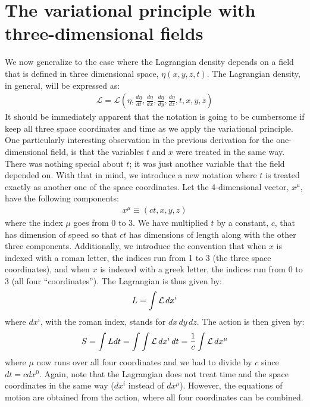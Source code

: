 \section{The variational principle with three-dimensional fields}
We now generalize to the case where the Lagrangian density depends on a field that is defined in three dimensional space, $\eta(x,y,z,t)$. The Lagrangian density, in general, will be expressed as:
\begin{align}
\mathcal{L}=\mathcal{L}(\eta,\frac{d\eta}{dt},\frac{d\eta}{dx},\frac{d\eta}{dy},\frac{d\eta}{dz},t,x,y,z)
\end{align}
It should be immediately apparent that the notation is going to be cumbersome if keep all three space coordinates and time as we apply the variational principle. One particularly interesting observation in the previous derivation for the one-dimensional field, is that the variables $t$ and $x$ were treated in the same way. There was nothing special about $t$; it was just another variable that the field depended on. With that in mind, we introduce a new notation where $t$ is treated exactly as another one of the space coordinates. Let the 4-dimensional vector, $x^\mu$, have the following components:
\begin{align}
x^\mu\equiv(ct,x,y,z)
\end{align}
where the index $\mu$ goes from 0 to 3. We have multiplied $t$ by a constant, $c$, that has dimension of speed so that $ct$ has dimensions of length along with the other three components. Additionally, we introduce the convention that when $x$ is indexed with a roman letter, the indices run from 1 to 3 (the three space coordinates), and when $x$ is indexed with a greek letter, the indices run from 0 to 3 (all four ``coordinates''). The Lagrangian is thus given by:
\begin{align}
L=\int \mathcal{L} \,dx^i
\end{align}
where $dx^i$, with the roman index, stands for $dx\,dy\,dz$. The action is then given by:
\begin{align}
S=\int L dt = \int \int \mathcal{L} \,dx^i \,dt =\frac{1}{c} \int \mathcal{L} \,dx^\mu
\end{align}
where $\mu$ now runs over all four coordinates and we had to divide by $c$ since $dt = c dx^0$. Again, note that the Lagrangian does not treat time and the space coordinates in the same way ($dx^i$ instead of $dx^\mu$). However, the equations of motion are obtained from the action, where all four coordinates can be combined.


